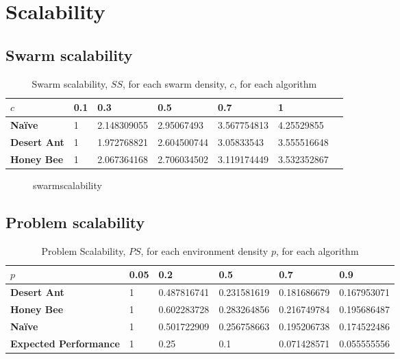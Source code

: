 \section{Scalability}
\label{results:scalability}

\subsection{Swarm scalability}
\begin{table}[]
\centering
\caption{Swarm scalability, $SS$, for each swarm density, $c$, for each algorithm}
\label{table:swarmscalability}
\begin{tabular}{@{}lllllll@{}}
\toprule
\textbf{$c$}            & \textbf{0.1} & \textbf{0.3}         & \textbf{0.5}         & \textbf{0.7}         & \textbf{1}           \\ \midrule
\textbf{Na\"ive}    & 1   & 2.148309055 & 2.95067493  & 3.567754813 & 4.25529855  \\
\textbf{Desert Ant} & 1   & 1.972768821 & 2.604500744 & 3.05833543  & 3.555516648 \\
\textbf{Honey Bee}  & 1   & 2.067364168 & 2.706034502 & 3.119174449 & 3.532352867 \\ \bottomrule
\end{tabular}
\end{table}

\begin{figure}[!htb]
\centering
\resizebox{\textwidth}{!}{}
\caption{swarmscalability}
\label{fig:swarmscalability}
\end{figure}


\subsection{Problem scalability}


\begin{table}[]
\centering
\caption{Problem Scalability, $PS$, for each environment density $p$, for each algorithm}
\label{table:problemscalability}
\begin{tabular}{@{}llllll@{}}
\toprule
\textbf{$p$}                  & \textbf{0.05} & \textbf{0.2        } & \textbf{0.5}         & \textbf{0.7}         & \textbf{0.9}         \\ \midrule
\textbf{Desert Ant}           & 1    & 0.487816741 & 0.231581619 & 0.181686679 & 0.167953071 \\
\textbf{Honey Bee}            & 1    & 0.602283728 & 0.283264856 & 0.216749784 & 0.195686487 \\
\textbf{Na\"ive}              & 1    & 0.501722909 & 0.256758663 & 0.195206738 & 0.174522486 \\
\textbf{Expected Performance} & 1    & 0.25        & 0.1         & 0.071428571 & 0.055555556 \\ \bottomrule
\end{tabular}
\end{table}

